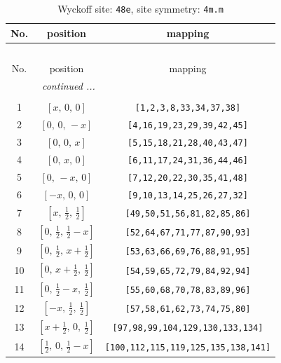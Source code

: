 \documentclass[fleqn,8pt]{jsarticle}
\begin{document}
\begin{longtable}{ccc}
\caption{Wyckoff site: {\tt 48e}, site symmetry: {\tt 4m.m}}
 \\
 \hline \hline
No. & position & mapping \\ \hline \endfirsthead

\multicolumn{2}{l}{\tablename\ \thetable{}} \\
 \hline \hline
No. & position & mapping \\ \hline \endhead

 \hline \hline
\multicolumn{2}{r}{\footnotesize\it continued ...} \\ \endfoot

 \hline \hline
\multicolumn{2}{r}{} \\ \endlastfoot

1 & $\left[ x,\, 0,\, 0 \right]$ & {\tt [1,2,3,8,33,34,37,38]} \\ \hline
2 & $\left[ 0,\, 0,\, - x \right]$ & {\tt [4,16,19,23,29,39,42,45]} \\ \hline
3 & $\left[ 0,\, 0,\, x \right]$ & {\tt [5,15,18,21,28,40,43,47]} \\ \hline
4 & $\left[ 0,\, x,\, 0 \right]$ & {\tt [6,11,17,24,31,36,44,46]} \\ \hline
5 & $\left[ 0,\, - x,\, 0 \right]$ & {\tt [7,12,20,22,30,35,41,48]} \\ \hline
6 & $\left[ - x,\, 0,\, 0 \right]$ & {\tt [9,10,13,14,25,26,27,32]} \\ \hline
7 & $\left[ x,\, \frac{1}{2},\, \frac{1}{2} \right]$ & {\tt [49,50,51,56,81,82,85,86]} \\ \hline
8 & $\left[ 0,\, \frac{1}{2},\, \frac{1}{2} - x \right]$ & {\tt [52,64,67,71,77,87,90,93]} \\ \hline
9 & $\left[ 0,\, \frac{1}{2},\, x + \frac{1}{2} \right]$ & {\tt [53,63,66,69,76,88,91,95]} \\ \hline
10 & $\left[ 0,\, x + \frac{1}{2},\, \frac{1}{2} \right]$ & {\tt [54,59,65,72,79,84,92,94]} \\ \hline
11 & $\left[ 0,\, \frac{1}{2} - x,\, \frac{1}{2} \right]$ & {\tt [55,60,68,70,78,83,89,96]} \\ \hline
12 & $\left[ - x,\, \frac{1}{2},\, \frac{1}{2} \right]$ & {\tt [57,58,61,62,73,74,75,80]} \\ \hline
13 & $\left[ x + \frac{1}{2},\, 0,\, \frac{1}{2} \right]$ & {\tt [97,98,99,104,129,130,133,134]} \\ \hline
14 & $\left[ \frac{1}{2},\, 0,\, \frac{1}{2} - x \right]$ & {\tt [100,112,115,119,125,135,138,141]} \\ \hline

\end{longtable}
\end{document}
